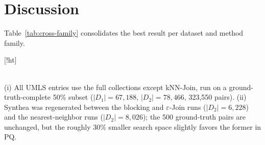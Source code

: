 \documentclass[runningheads]{llncs}
\makeatletter
\renewenvironment{table}
  {\setlength\abovecaptionskip{0\p@}%
   \setlength\belowcaptionskip{7\p@}%
   \@float{table}}
  {\end@float}
\makeatother
\begin{document}
\section{Discussion}
\label{sec:discussion}

Table~\ref{tab:cross-family} consolidates the best result per dataset and method family.

\begin{table}[!ht]
\centering
\caption{Best $F_1$ per dataset and method family; per-metric values are in
Tables~\ref{tab:medical-blocking} to~\ref{tab:dense-nn}. FAISS entries are the better of Flat
and HNSW (Flat except on Synthea); dense and kNN-Join entries are at $k^{*}$; DeepBlocker
entries are best PC (marked $\ddagger$), since PQ is unavailable
(Table~\ref{tab:deepblocker}). Bold marks the best comparable $F_1$ per row.}
\label{tab:cross-family}
\vspace{2pt}
\\ \footnotesize (i) All UMLS entries use the full collections except kNN-Join, run on a
ground-truth-complete 50\% subset ($|D_1|=67{,}188$, $|D_2|=78{,}466$, 323{,}550 pairs).
(ii) Synthea was regenerated between the blocking and $\varepsilon$-Join runs
($|D_2|=6{,}228$) and the nearest-neighbor runs ($|D_2|=8{,}026$); the 500 ground-truth pairs
are unchanged, but the roughly 30\% smaller search space slightly favors the former in PQ.
\end{table}
\end{document}
